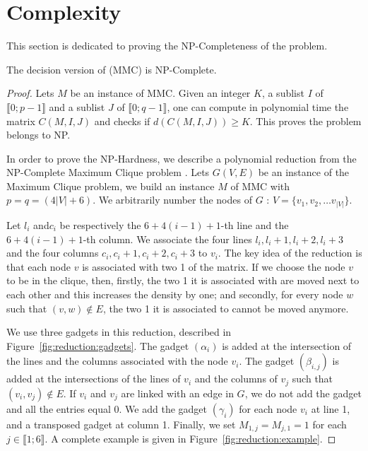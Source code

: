 \section{Complexity}
\label{sect:complexity}
 
This section is dedicated to proving the NP-Completeness of the problem.

  \begin{theorem}
  \label{theo:complexity}
  The decision version of (MMC) is NP-Complete.
  \end{theorem}
  \begin{proof}
 

    Lets $M$ be an instance of MMC. Given an integer $K$, a sublist $I$ of $\llbracket 0; p-1 \rrbracket$ and a sublist $J$ of $\llbracket 0; q-1 \rrbracket$, one can compute in polynomial time the matrix $C(M,I,J)$ and checks if $d(C(M,I,J)) \geq K$. This proves the problem belongs to NP.

    In order to prove the NP-Hardness, we describe a polynomial reduction from the NP-Complete Maximum Clique problem \cite{Karp1972}. Lets $G(V,E)$ be an instance of the Maximum Clique problem, we build an instance $M$ of MMC with $p = q = (4|V| + 6)$. We arbitrarily number the nodes of $G$ : $V = \{v_1, v_2, \dots v_{|V|}\}$.

    Let $l_i$ and$c_i$ be respectively the $6+4(i-1)+1$-th line and the $6+4(i-1)+1$-th column. We associate the four lines $l_i, l_i+1, l_i+2, l_i+3$ and the four columns $c_i, c_i +1, c_i+2, c_i + 3$ to $v_i$. The key idea of the reduction is that each node $v$ is associated with two 1 of the matrix. If we choose the node $v$ to be in the clique, then, firstly, the two 1 it is associated with are moved next to each other and this increases the density by one; and secondly, for every node $w$ such that $(v,w) \not\in E$, the two 1 it is associated to cannot be moved anymore.

    We use three gadgets in this reduction, described in Figure~\ref{fig:reduction:gadgets}. The gadget $(\alpha_i)$ is added at the intersection of the lines and the columns associated with the node $v_i$. The gadget $(\beta_{i,j})$ is added at the intersections of the lines of $v_i$ and the columns of $v_j$ such that $(v_i,v_j) \not\in E$. If $v_i$ and $v_j$ are linked with an edge in $G$, we do not add the gadget and all the entries equal 0. We add the gadget $(\gamma_i)$ for each node $v_i$ at line 1, and a transposed gadget at column 1. Finally, we set $M_{1,j} = M_{j,1} = 1$ for each $j \in \llbracket 1;6 \rrbracket$. A complete example is given in Figure~\ref{fig:reduction:example}.


\end{proof}
